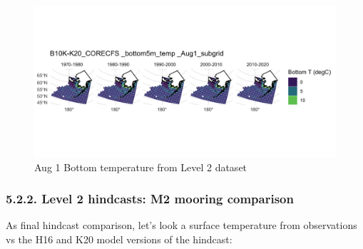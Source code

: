 \documentclass[
]{article}
\begin{document}
\begin{figure}
\centering
\includegraphics[width=1\textwidth,height=\textheight]{Figs/Hind_sub_grid_mn_BT_Aug1.jpg}
\caption{Aug 1 Bottom temperature from Level 2 dataset}
\end{figure}

\hypertarget{level-2-hindcasts-m2-mooring-comparison}{%
\subsubsection{5.2.2. Level 2 hindcasts: M2 mooring
comparison}\label{level-2-hindcasts-m2-mooring-comparison}}

As final hindcast comparison, let's look a surface temperature from
observations vs the H16 and K20 model versions of the hindcast:
\end{document}

